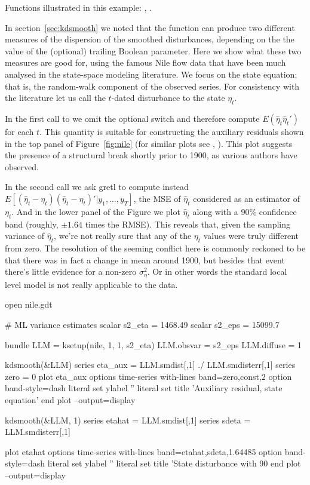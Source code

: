 Functions illustrated in this example: , .

In section~\ref{sec:kdsmooth} we noted that the 
function can produce two different measures of the dispersion of the
smoothed disturbances, depending on the the value of the (optional)
trailing Boolean parameter. Here we show what these two measures are
good for, using the famous Nile flow data that have been much analysed
in the state-space modeling literature. We focus on the state
equation; that is, the random-walk component of the observed series.
For consistency with the literature let us call the $t$-dated
disturbance to the state $\eta_t$.

In the first call to  we omit the optional switch and
therefore compute $E(\hat{\eta}_t\hat{\eta}_t')$ for each $t$. This
quantity is suitable for constructing the auxiliary residuals shown in
the top panel of Figure~\ref{fig:nile} (for similar plots see
\cite{koopman-etal99}, \cite{pelagatti11}).  This plot suggests the
presence of a structural break shortly prior to 1900, as various
authors have observed.

In the second  call we ask gretl to compute instead
$E[(\hat{\eta}_t-\eta_t)(\hat{\eta}_t-\eta_t)' | y_1,\ldots,y_T]$, the
MSE of $\hat{\eta}_t$ considered as an estimator of $\eta_t$. And in
the lower panel of the Figure we plot $\hat{\eta}_t$ along with a 90\%
confidence band (roughly, $\pm 1.64$ times the RMSE). This reveals
that, given the sampling variance of $\hat{\eta}_t$, we're not really
sure that any of the $\eta_t$ values were truly different from
zero. The resolution of the seeming conflict here is commonly reckoned
to be that there was in fact a change in mean around 1900, but besides
that event there's little evidence for a non-zero
$\sigma^2_{\eta}$. Or in other words the standard local level model is
not really applicable to the data.


\begin{script}[htbp]
  \label{script:auxres}
\begin{scode}
open nile.gdt

# ML variance estimates
scalar s2_eta = 1468.49
scalar s2_eps = 15099.7

bundle LLM = ksetup(nile, 1, 1, s2_eta)
LLM.obsvar = s2_eps
LLM.diffuse = 1

kdsmooth(&LLM)
series eta_aux = LLM.smdist[,1] ./ LLM.smdisterr[,1]
series zero = 0
plot eta_aux
    options time-series with-lines band=zero,const,2
    option band-style=dash
    literal set ylabel ''
    literal set title 'Auxiliary residual, state equation'
end plot --output=display

kdsmooth(&LLM, 1)
series etahat = LLM.smdist[,1]
series sdeta = LLM.smdisterr[,1]

plot etahat
    options time-series with-lines band=etahat,sdeta,1.64485
    option band-style=dash
    literal set ylabel ''
    literal set title 'State disturbance with 90%
end plot --output=display
\end{scode}
\end{script}

